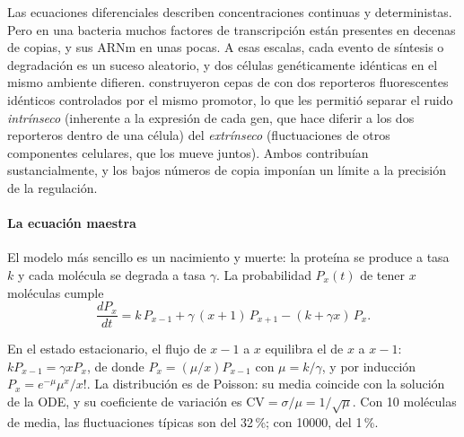 Las ecuaciones diferenciales describen concentraciones continuas y deterministas. Pero en una bacteria muchos factores de transcripción están presentes en decenas de copias, y sus ARNm en unas pocas. A esas escalas, cada evento de síntesis o degradación es un suceso aleatorio, y dos células genéticamente idénticas en el mismo ambiente difieren. \textcite{c16-elowitz2002} construyeron cepas de  con dos reporteros fluorescentes idénticos controlados por el mismo promotor, lo que les permitió separar el ruido \emph{intrínseco} (inherente a la expresión de cada gen, que hace diferir a los dos reporteros dentro de una célula) del \emph{extrínseco} (fluctuaciones de otros componentes celulares, que los mueve juntos). Ambos contribuían sustancialmente, y los bajos números de copia imponían un límite a la precisión de la regulación.

\paragraph{La ecuación maestra} El modelo más sencillo es un nacimiento y muerte: la proteína se produce a tasa $k$ y cada molécula se degrada a tasa $\gamma$. La probabilidad $P_x(t)$ de tener $x$ moléculas cumple
\begin{equation}\label{eq:16-cme}
\frac{dP_x}{dt}=k\,P_{x-1}+\gamma\,(x+1)\,P_{x+1}-(k+\gamma x)\,P_x .
\end{equation}
\begin{simbolos}
\end{simbolos}
En el estado estacionario, el flujo de $x-1$ a $x$ equilibra el de $x$ a $x-1$: $kP_{x-1}=\gamma x P_x$, de donde $P_x=(\mu/x)P_{x-1}$ con $\mu=k/\gamma$, y por inducción $P_x=e^{-\mu}\mu^x/x!$. La distribución es de Poisson: su media coincide con la solución de la ODE, y su coeficiente de variación es $\mathrm{CV}=\sigma/\mu=1/\sqrt{\mu}$. Con 10 moléculas de media, las fluctuaciones típicas son del 32\,\%; con \num{10000}, del 1\,\%.

